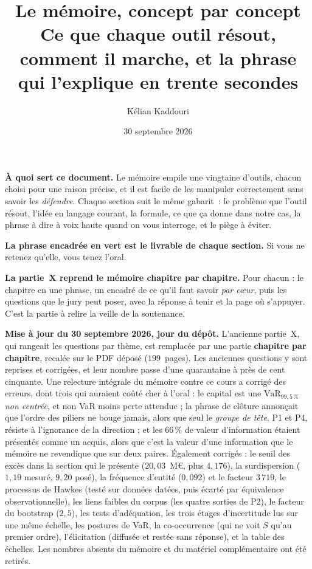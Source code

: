 \documentclass[11pt,a4paper]{article}
\title{\vspace{-1.3cm}\color{navy}\bfseries Le mémoire, concept par concept\\[3pt]
  \large Ce que chaque outil résout, comment il marche,
  et la phrase qui l'explique en trente secondes}
\author{Kélian Kaddouri}
\date{30 septembre 2026}
\begin{document}
\maketitle
\vspace{-0.8cm}

\begin{cle}
\textbf{À quoi sert ce document.} Le mémoire empile une vingtaine d'outils, chacun choisi
pour une raison précise, et il est facile de les manipuler correctement sans savoir les
\emph{défendre}. Chaque section suit le même gabarit~: le problème que l'outil résout,
l'idée en langage courant, la formule, ce que ça donne dans notre cas, la phrase à dire à
voix haute quand on vous interroge, et le piège à éviter.

\textbf{La phrase encadrée en vert est le livrable de chaque section.} Si vous ne retenez
qu'elle, vous tenez l'oral.

\textbf{La partie~X reprend le mémoire chapitre par chapitre.} Pour chacun : le chapitre en une
phrase, un encadré de ce qu'il faut savoir \emph{par c\oe ur}, puis les questions que le jury peut
poser, avec la réponse à tenir et la page où s'appuyer. C'est la partie à relire la veille de la
soutenance.
\end{cle}

\smallskip
\noindent\textcolor{accent}{\textbf{Mise à jour du 30 septembre 2026, jour du dépôt.}}
L'ancienne partie~X, qui rangeait les questions par thème, est remplacée par une partie
\textbf{chapitre par chapitre}, recalée sur le PDF déposé ($199$~pages). Les anciennes questions y
sont reprises et corrigées, et leur nombre passe d'une quarantaine à près de cent cinquante. Une
relecture intégrale du mémoire contre ce cours a corrigé des erreurs, dont
\textcolor{accent}{trois qui auraient coûté cher à l'oral} : le capital est une
$\mathrm{VaR}_{99{,}5\,\%}$ \emph{non centrée}, et non \og VaR moins perte attendue\fg{} ; la phrase de
clôture annonçait que l'ordre des piliers ne bouge jamais, alors que seul le \emph{groupe de tête},
P1 et P4, résiste à l'ignorance de la direction ; et les $66\,\%$ de valeur d'information étaient
présentés comme un acquis, alors que c'est la valeur d'une information que le mémoire ne revendique
que sur deux paires. Également corrigés : le seuil des excès dans la section qui le présente
($20{,}03$~M\euro, plus $4{,}176$), la surdispersion ($1{,}19$ mesuré, $9{,}20$ posé), la fréquence
d'entité ($0{,}092$) et le facteur $3\,719$, le processus de Hawkes (testé sur données datées, puis
écarté par équivalence observationnelle), les liens faibles du corpus (les quatre sorties de P2),
le facteur du bootstrap ($2{,}5$), les tests d'adéquation, les trois étages d'incertitude lus sur
une même échelle, les postures de VaR, la co-occurrence (qui ne voit $S$ qu'au premier ordre),
l'élicitation (diffusée et restée sans réponse), et la table des échelles. Les nombres absents du
mémoire et du matériel complémentaire ont été retirés.
\end{document}
